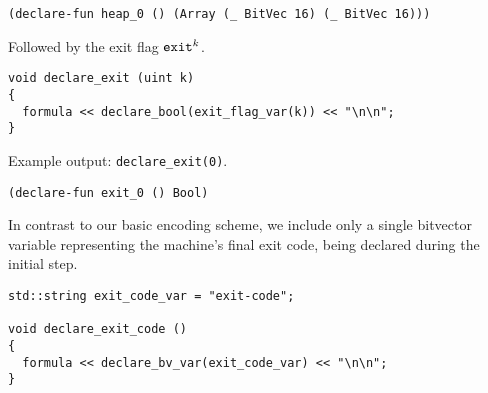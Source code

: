 \begin{lstlisting}[language=SMTLib]
(declare-fun heap_0 () (Array (_ BitVec 16) (_ BitVec 16)))
\end{lstlisting}




%

\newpage

\noindent
Followed by the exit flag $\texttt{exit}^k$.

\begin{lstlisting}[style=c++]
void declare_exit (uint k)
{
  formula << declare_bool(exit_flag_var(k)) << "\n\n";
}
\end{lstlisting}

\noindent
Example output: \lstinline[style=c++]{declare_exit(0)}.

\begin{lstlisting}[language=SMTLib]
(declare-fun exit_0 () Bool)
\end{lstlisting}


\noindent
In contrast to our basic encoding scheme, we include only a single bitvector variable representing the machine's final exit code, being declared during the initial step.

\begin{lstlisting}[style=c++]
std::string exit_code_var = "exit-code";

void declare_exit_code ()
{
  formula << declare_bv_var(exit_code_var) << "\n\n";
}
\end{lstlisting}

